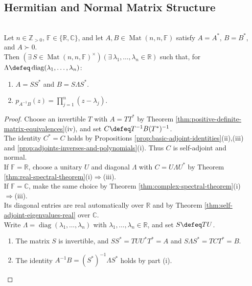 \subsection{Hermitian and Normal Matrix Structure}

\begin{theorem} \label{thm:simultaneous-congruence-one-positive-definite-form} \\
Let $n\in\mathbb{Z}_{>0}$, $\mathbb{F}\in\{\mathbb{R},\mathbb{C}\}$, and let $A,B\in\operatorname{Mat}(n,n,\mathbb{F})$ satisfy $A=A^*$, $B=B^*$, and $A\succ0$.\\
Then $(\exists\,S\in\operatorname{Mat}(n,n,\mathbb{F})^\times)(\exists\,\lambda_1,\ldots,\lambda_n\in\mathbb{R})$ such that, for $\Lambda\defeq\operatorname{diag}(\lambda_1,\ldots,\lambda_n)$:
\begin{enumerate}[label=(\roman*)]
\setlength{\itemsep}{0pt}
\item $A=SS^*$ and $B=S\Lambda S^*$.
\item $p_{A^{-1}B}(z)=\prod\limits_{j=1}^{n}(z-\lambda_j)$.
\end{enumerate}
\begin{proof}
Choose an invertible $T$ with $A=TT^*$ by Theorem \ref{thm:positive-definite-matrix-equivalences}(iv), and set $C\defeq T^{-1}B(T^*)^{-1}$.\\
The identity $C^*=C$ holds by Propositions \ref{prop:basic-adjoint-identities}(ii),(iii) and \ref{prop:adjoints-inverses-and-polynomials}(i). Thus $C$ is self-adjoint and normal.\\
If $\mathbb{F}=\mathbb{R}$, choose a unitary $U$ and diagonal $\Lambda$ with $C=U\Lambda U^*$ by Theorem \ref{thm:real-spectral-theorem}(i)$\Rightarrow$(iii).\\
If $\mathbb{F}=\mathbb{C}$, make the same choice by Theorem \ref{thm:complex-spectral-theorem}(i)$\Rightarrow$(iii).\\
Its diagonal entries are real automatically over $\mathbb{R}$ and by Theorem \ref{thm:self-adjoint-eigenvalues-real} over $\mathbb{C}$.\\
Write $\Lambda=\operatorname{diag}(\lambda_1,\ldots,\lambda_n)$ with $\lambda_1,\ldots,\lambda_n\in\mathbb{R}$, and set $S\defeq TU$.
\begin{enumerate}[label=(\roman*)]
\setlength{\itemsep}{0pt}
\item The matrix $S$ is invertible, and $SS^*=TUU^*T^*=A$ and $S\Lambda S^*=TCT^*=B$.
\item The identity $A^{-1}B=(S^*)^{-1}\Lambda S^*$ holds by part (i).\\

\end{enumerate}
\end{proof}
\end{theorem}

